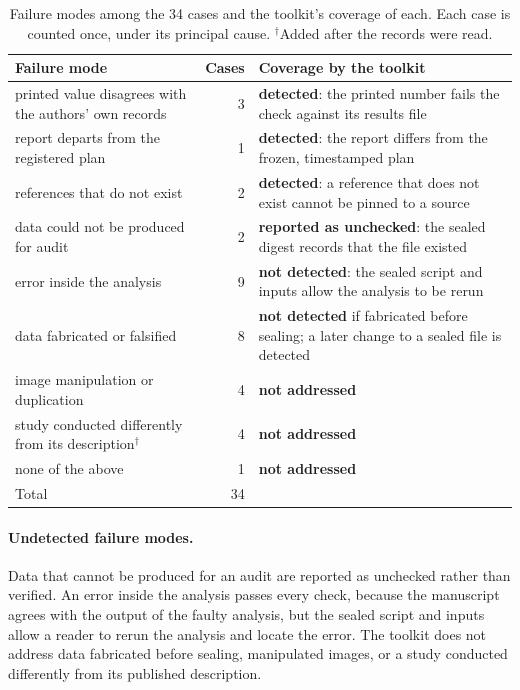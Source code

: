 \vspace{0.5em}
\begin{table}[h]
\centering
\small
\caption{Failure modes among the 34 cases and the toolkit's coverage of each. Each case is
counted once, under its principal cause. $^{\dagger}$Added after the records were read.}
\label{tab:fc-modes}
\begin{tabular}{@{}>{\raggedright\arraybackslash}p{}r>{\raggedright\arraybackslash}p{}@{}}
\toprule
\textbf{Failure mode} & \textbf{Cases} & \textbf{Coverage by the toolkit} \\
\midrule
printed value disagrees with the authors' own records & 3 & \textbf{detected}: the printed number fails the check against its results file \\
report departs from the registered plan & 1 & \textbf{detected}: the report differs from the frozen, timestamped plan \\
references that do not exist & 2 & \textbf{detected}: a reference that does not exist cannot be pinned to a source \\
\midrule
data could not be produced for audit & 2 & \textbf{reported as unchecked}: the sealed digest records that the file existed \\
error inside the analysis & 9 & \textbf{not detected}: the sealed script and inputs allow the analysis to be rerun \\
data fabricated or falsified & 8 & \textbf{not detected} if fabricated before sealing; a later change to a sealed file is detected \\
\midrule
image manipulation or duplication & 4 & \textbf{not addressed} \\
study conducted differently from its description$^{\dagger}$ & 4 & \textbf{not addressed} \\
none of the above & 1 & \textbf{not addressed} \\
\midrule
Total & 34 & \\
\bottomrule
\end{tabular}
\end{table}

\paragraph{Undetected failure modes.} Data that cannot be produced for an audit are reported as
unchecked rather than verified. An error inside the analysis passes every check, because the
manuscript agrees with the output of the faulty analysis, but the sealed script and inputs
allow a reader to rerun the analysis and locate the error. The toolkit does not address data
fabricated before sealing, manipulated images, or a study conducted differently from its
published description.

